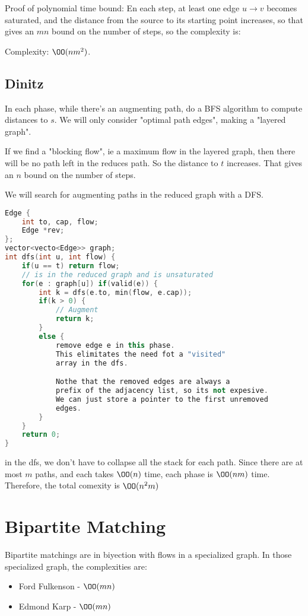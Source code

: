 \documentclass{article}
\begin{document}
	Proof of polynomial time bound:
	En each step, at least one edge $u \to v$ becomes saturated, and the distance from the source to its starting point increases, so that gives an $mn$ bound on the number of steps, so the complexity is:

	Complexity: $\OO (nm^2)$.

	\subsection*{Dinitz}
	In each phase, while there's an augmenting path, do a BFS algorithm to compute distances to $s$. We will only consider "optimal path edges", making a "layered graph".

	If we find a "blocking flow", ie a maximum flow in the layered graph, then there will be no path left in the reduces path. So the distance to $t$ increases. That gives an $n$ bound on the number of steps.

	We will search for augmenting paths in the reduced graph with a DFS.

	\begin{lstlisting}[language=C++]
Edge {
	int to, cap, flow;
	Edge *rev;
};
vector<vecto<Edge>> graph;
int dfs(int u, int flow) {
	if(u == t) return flow;
	// is in the reduced graph and is unsaturated
	for(e : graph[u]) if(valid(e)) {
		int k = dfs(e.to, min(flow, e.cap));
		if(k > 0) {
			// Augment
			return k;
		}
		else {
			remove edge e in this phase.
			This elimitates the need fot a "visited"
			array in the dfs.

			Nothe that the removed edges are always a
			prefix of the adjacency list, so its not expesive.
			We can just store a pointer to the first unremoved
			edges.
		}
	}
	return 0;
}
	\end{lstlisting}
	in the dfs, we don't have to collapse all the stack for each path.
	Since there are at most $m$ paths, and each takes $\OO(n)$ time, each phase is $\OO(nm)$ time. Therefore, the total comexity is $\OO(n^2m)$

	\section*{Bipartite Matching}
	Bipartite matchings are in biyection with flows in a specialized graph. In those specialized graph, the complexities are:
	\begin{itemize}
		\item Ford Fulkenson - $\OO(mn)$
		\item Edmond Karp - $\OO(mn)$
	\end{itemize}
\end{document}
